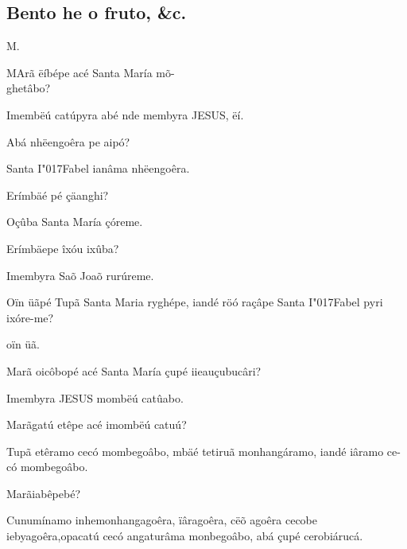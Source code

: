 \documentclass[openany,titlepage,12pt]{book}
\newcommand{\lgS}{\char"017F}
\newcommand{\comecalista}[5]{
    \hspace*{-11.7pt}
    \begin{minipage}[t]{0.08\linewidth}
        \flushright #1\\#2
    \end{minipage}
    \hspace{0pt}
    \begin{minipage}[t]{0.94\linewidth}
        \lettrine
        [findent =2pt, nindent=0pt,  lines=2]
        {#3}{#4}#5
    \end{minipage}
    \vspace*{-3pt}
}
\begin{document}
\subsection{Bento he o fruto, \&c.}
\unskip\vspace*{-12pt}
\comecalista{M.}{}{M}{A}
    {rã ëíbépe acé Santa María mõ-\\
    ghetâbo?}
\begin{altereven}
    \item Imembëú catúpyra abé nde membyra JESUS, ëí.
    \item Abá nhëengoêra pe aipó?
    \item Santa I\lgS abel ianâma nhëengoêra.
    \item Erímbäé pé çäanghi?
    \item Oçûba Santa María çóreme.
    \item Erímbäepe îxóu ixûba?
    \item Imembyra Saõ Joaõ rurúreme.
    \item Oïn üãpé Tupã Santa Maria ryghépe,\linebreak
    \newpage iandé röó raçâpe Santa I\lgS abel pyri ixóre-me?
    \item oïn üã.
    \item Marã oicôbopé acé Santa María çupé\linebreak
    iieauçubucâri?
    \item Imembyra JESUS mombëú catûabo.
    \item Marãgatú etêpe acé imombëú catuú?
    \item Tupã etêramo cecó mombegoâbo, mbäé tetiruã 
    monhangáramo, iandé iâramo ce-có mombegoâbo.
    \item Marãiabêpebé?
    \item Cunumínamo inhemonhangagoêra, ïâragoêra, cëõ
    agoêra cecobe iebyagoêra,\linebreak opacatú cecó angaturâma
    monbegoâbo, abá çupé cerobiárucá.
\end{altereven}
\end{document}
